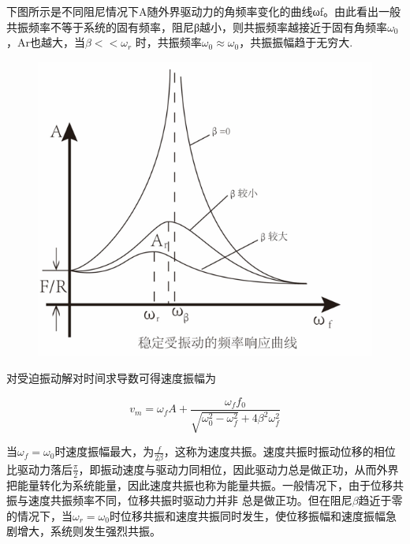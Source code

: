 \documentclass[12pt,a4paper]{ctexart}
\begin{document}
	
	下图所示是不同阻尼情况下A随外界驱动力的角频率变化的曲线ωf。由此看出一般共振频率不等于系统的固有频率，阻尼β越小，则共振频率越接近于固有角频率$\omega_0$，Ar也越大，当$\beta<<\omega_r$
	时，共振频率$\omega_0\approx \omega_0$，共振振幅趋于无穷大.
	\textbf{}\
	
	
	
	
	\begin{figure}[h] %
		\centering %
		\includegraphics[scale=0.6]{T16.PNG} %
	\end{figure}%
	
	\noindent\textbf{}
	
	对受迫振动解对时间求导数可得速度振幅为
	
	$$v_m=\omega_fA+\frac{\omega_f f_0}{\sqrt{\omega_0^2-\omega_f^2}+4\beta^2\omega_f^2}$$
	
	
	当$\omega_f=\omega_0$时速度振幅最大，为$\frac{f}{2\beta}$，这称为速度共振。速度共振时振动位移的相位比驱动力落后$\frac{\pi}{2}$，即振动速度与驱动力同相位，因此驱动力总是做正功，从而外界把能量转化为系统能量，因此速度共振也称为能量共振。一般情况下，由于位移共振与速度共振频率不同，位移共振时驱动力并非
	\noindent 总是做正功。但在阻尼$\beta$趋近于零的情况下，当$\omega_r=\omega_0$时位移共振和速度共振同时发生，使位移振幅和速度振幅急剧增大，系统则发生强烈共振。
	
\end{document}
